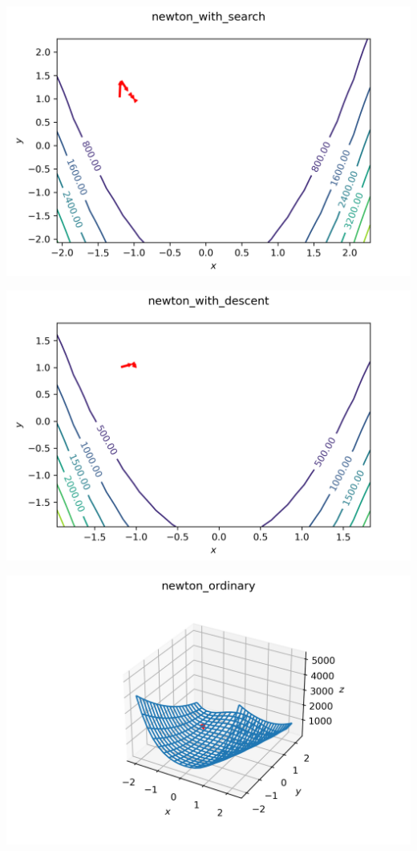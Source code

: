 \documentclass[english]{article}
\begin{document}
\begin{center}
  \includegraphics[scale=0.7]{plots/contours_newton_with_search_5.png}
\end{center}
\begin{center}
  \includegraphics[scale=0.7]{plots/contours_newton_with_descent_5.png}
\end{center}
\begin{center}
  \includegraphics[scale=0.7]{plots/3D_newton_ordinary_5.png}
\end{center}
\end{document}
